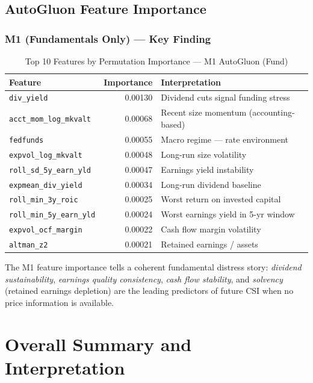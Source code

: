 \documentclass{report}\usepackage[]{graphicx}\usepackage[table]{xcolor}
\begin{document}
\section{AutoGluon Feature Importance}

\subsection{M1 (Fundamentals Only) — Key Finding}

\begin{table}[H]
\centering
\caption{Top 10 Features by Permutation Importance — M1 AutoGluon (Fund)}
\begin{tabular}{lrl}
\toprule
\textbf{Feature} & \textbf{Importance} & \textbf{Interpretation} \\
\midrule
\texttt{div\_yield} & 0.00130 & Dividend cuts signal funding stress \\
\texttt{acct\_mom\_log\_mkvalt} & 0.00068 & Recent size momentum (accounting-based) \\
\texttt{fedfunds} & 0.00055 & Macro regime — rate environment \\
\texttt{expvol\_log\_mkvalt} & 0.00048 & Long-run size volatility \\
\texttt{roll\_sd\_5y\_earn\_yld} & 0.00047 & Earnings yield instability \\
\texttt{expmean\_div\_yield} & 0.00034 & Long-run dividend baseline \\
\texttt{roll\_min\_3y\_roic} & 0.00025 & Worst return on invested capital \\
\texttt{roll\_min\_5y\_earn\_yld} & 0.00024 & Worst earnings yield in 5-yr window \\
\texttt{expvol\_ocf\_margin} & 0.00022 & Cash flow margin volatility \\
\texttt{altman\_z2} & 0.00021 & Retained earnings / assets \\
\bottomrule
\end{tabular}
\end{table}

\noindent The M1 feature importance tells a coherent fundamental distress story: 
\textit{dividend sustainability}, \textit{earnings quality consistency}, 
\textit{cash flow stability}, and \textit{solvency} (retained earnings depletion) 
are the leading predictors of future CSI when no price information is available.

\chapter{Overall Summary and Interpretation}
\label{ch:summary}
\end{document}
